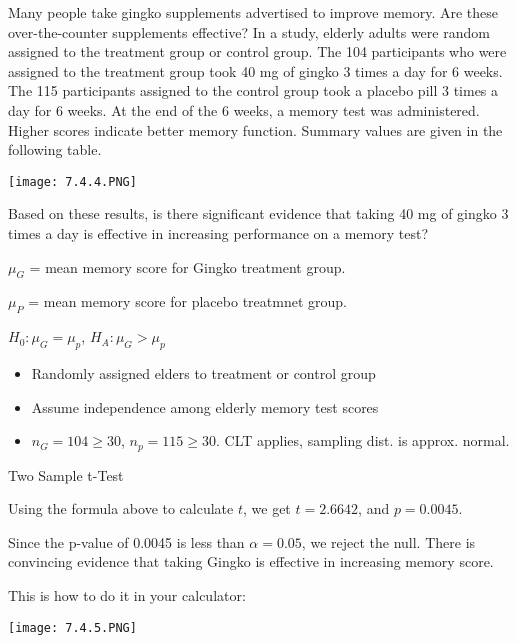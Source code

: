 \documentclass[../stats.tex]{subfiles}
\begin{document}
\begin{example}
    Many people take gingko supplements advertised to improve memory. Are these over-the-counter supplements effective? In a study, elderly adults were random assigned to the treatment group or control group. 
    The 104 participants who were assigned to the treatment group took 40 mg of gingko 3 times a day for 6 weeks. The 115 participants assigned to the control group took a placebo pill 3 times a day for 6 weeks. At 
    the end of the 6 weeks, a memory test was administered. Higher scores indicate better memory function. Summary values are given in the following table.

    \begin{center}
        \texttt{[image: 7.4.4.PNG]}
    \end{center}
    Based on these results, is there significant evidence that taking 40 mg of gingko 3 times a day is effective in increasing performance on a memory test?

    $\mu_G$ = mean memory score for Gingko treatment group.

    $\mu_P$ = mean memory score for placebo treatmnet group.

    $H_0: \mu_G=\mu_p$, $H_A: \mu_G>\mu_p$

    \begin{itemize}
        \item Randomly assigned elders to treatment or control group
        \item Assume independence among elderly memory test scores 
        \item $n_G=104\geq 30$, $n_p=115\geq 30$. CLT applies, sampling dist. is approx. normal.
    \end{itemize}

    Two Sample t-Test 

    Using the formula above to calculate $t$, we get $t=2.6642$, and $p=0.0045$.

    Since the p-value of 0.0045 is less than $\alpha=0.05$, we reject the null. There is convincing evidence that taking Gingko is effective in increasing memory score.

    This is how to do it in your calculator:
    \begin{center}
        \texttt{[image: 7.4.5.PNG]}
    \end{center}
\end{example}
\end{document}
